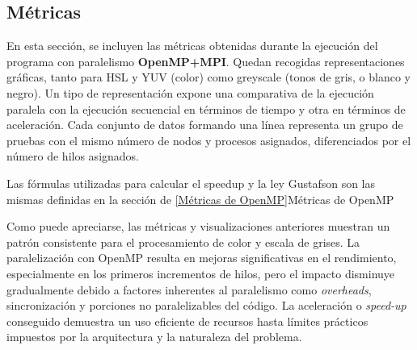 \subsection{Métricas}
En esta sección, se incluyen las métricas obtenidas durante la ejecución del programa con paralelismo \textbf{OpenMP+MPI}. 
Quedan recogidas representaciones gráficas, tanto para HSL y YUV (color) como greyscale (tonos de gris, o blanco y negro).
Un tipo de representación expone una comparativa de la ejecución paralela con la ejecución secuencial en términos de tiempo y otra en términos de aceleración. 
Cada conjunto de datos formando una línea representa un grupo de pruebas con el mismo número de nodos y procesos asignados, diferenciados por el número de hilos asignados.

Las fórmulas utilizadas para calcular el speedup y la ley Gustafson son las mismas definidas en la sección de \ref{Métricas de OpenMP}{Métricas de OpenMP}



\newpage
{}

Como puede apreciarse, las métricas y visualizaciones anteriores muestran un patrón consistente para el procesamiento de color y escala de grises. 
La paralelización con OpenMP resulta en mejoras significativas en el rendimiento, especialmente en los primeros incrementos de hilos, pero el impacto disminuye gradualmente debido a factores inherentes al paralelismo como \textit{overheads}, sincronización y porciones no paralelizables del código. La aceleración o \textit{speed-up} conseguido demuestra un uso eficiente de recursos hasta límites prácticos impuestos por la arquitectura y la naturaleza del problema.
\newpage